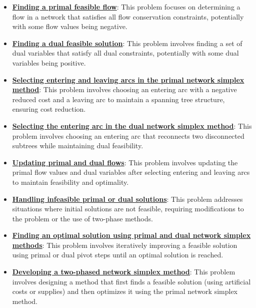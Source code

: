 \documentclass{article}%
\begin{document}
\begin{itemize}[leftmargin=*]
\item \href{https://www.math.purdue.edu/~yipn/421/2024-11-07-NetSimplex.pdf#page=2}{\textbf{Finding a primal feasible flow}}: This problem focuses on determining a flow in a network that satisfies all flow conservation constraints, potentially with some flow values being negative.%
\item \href{https://www.math.purdue.edu/~yipn/421/2024-11-07-NetSimplex.pdf#page=3}{\textbf{Finding a dual feasible solution}}: This problem involves finding a set of dual variables that satisfy all dual constraints, potentially with some dual variables being positive.%
\item \href{https://www.math.purdue.edu/~yipn/421/2024-11-07-NetSimplex.pdf#page=6}{\textbf{Selecting entering and leaving arcs in the primal network simplex method}}: This problem involves choosing an entering arc with a negative reduced cost and a leaving arc to maintain a spanning tree structure, ensuring cost reduction.%
\item \href{https://www.math.purdue.edu/~yipn/421/2024-11-07-NetSimplex.pdf#page=35}{\textbf{Selecting the entering arc in the dual network simplex method}}: This problem involves choosing an entering arc that reconnects two disconnected subtrees while maintaining dual feasibility.%
\item \href{https://www.math.purdue.edu/~yipn/421/2024-11-07-NetSimplex.pdf#page=6}{\textbf{Updating primal and dual flows}}: This problem involves updating the primal flow values and dual variables after selecting entering and leaving arcs to maintain feasibility and optimality.%
\item \href{https://www.math.purdue.edu/~yipn/421/2024-11-07-NetSimplex.pdf#page=2}{\textbf{Handling infeasible primal or dual solutions}}: This problem addresses situations where initial solutions are not feasible, requiring modifications to the problem or the use of two-phase methods.%
\item \href{https://www.math.purdue.edu/~yipn/421/2024-11-07-NetSimplex.pdf#page=5}{\textbf{Finding an optimal solution using primal and dual network simplex methods}}: This problem involves iteratively improving a feasible solution using primal or dual pivot steps until an optimal solution is reached.%
\item \href{https://www.math.purdue.edu/~yipn/421/2024-11-07-NetSimplex.pdf#page=45}{\textbf{Developing a two-phased network simplex method}}: This problem involves designing a method that first finds a feasible solution (using artificial costs or supplies) and then optimizes it using the primal network simplex method.%

\end{itemize}
\end{document}
